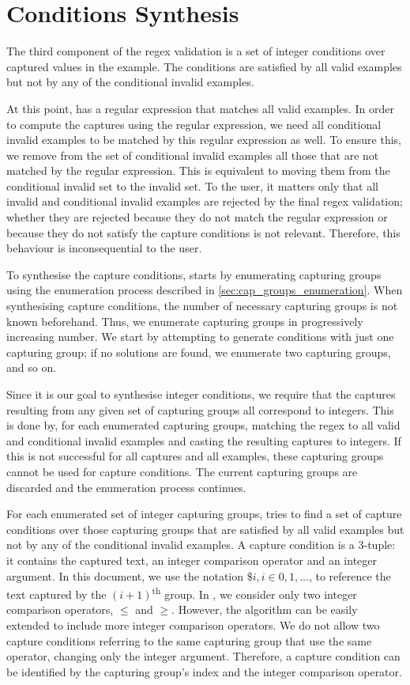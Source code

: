 \section{Conditions Synthesis}\label{sec:cap_cond_synthesis}
The third component of the regex validation is a set of integer conditions over captured values in the example. The conditions are satisfied by all valid examples but not by any of the conditional invalid examples.

At this point, \Forest has a regular expression that matches all valid examples.
In order to compute the captures using the regular expression, we need all conditional invalid examples to be matched by this regular expression as well.
To ensure this, we remove from the set of conditional invalid examples all those that are not matched by the regular expression. 
This is equivalent to moving them from the conditional invalid set to the invalid set.
To the user, it matters only that all invalid and conditional invalid examples are rejected by the final regex validation; whether they are rejected because they do not match the regular expression or because they do not satisfy the capture conditions is not relevant. Therefore, this behaviour is inconsequential to the user.

To synthesise the capture conditions, \Forest starts by enumerating capturing groups using the enumeration process described in \autoref{sec:cap_groups_enumeration}. When synthesising capture conditions, the number of necessary capturing groups is not known beforehand. Thus, we enumerate capturing groups in progressively increasing number. We start by attempting to generate conditions with just one capturing group; if no solutions are found, we enumerate two capturing groups, and so on.

Since it is our goal to synthesise integer conditions, we require that the captures resulting from any given set of capturing groups all correspond to integers. This is done by, for each enumerated capturing groups, matching the regex to all valid and conditional invalid examples and casting the resulting captures to integers. If this is not successful for all captures and all examples, these capturing groups cannot be used for capture conditions. The current capturing groups are discarded and the enumeration process continues.


For each enumerated set of integer capturing groups, \Forest tries to find a set of capture conditions over those capturing groups that are satisfied by all valid examples but not by any of the conditional invalid examples.
%
A capture condition is a 3-tuple: it contains the captured text, an integer comparison operator and an integer argument. In this document, we use the notation \(\$i, i \in 0, 1, ...\), to reference the text captured by the \((i+1)\)\textsuperscript{th} group. In \Forest, we consider only two integer comparison operators, $\le$ and $\ge$. However, the algorithm can be easily extended to include more integer comparison operators. We do not allow two capture conditions referring to the same capturing group that use the same operator, changing only the integer argument. Therefore, a capture condition can be identified by the capturing group's index and the integer comparison operator.

